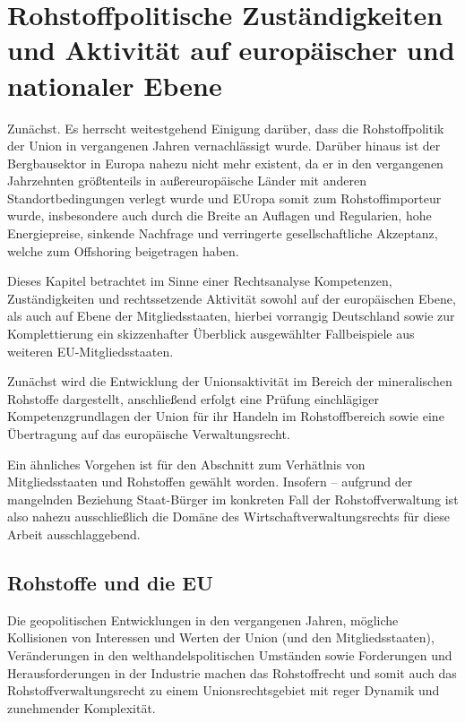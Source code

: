 \documentclass[12pt,a4paper,oneside]{book} %
\begin{document}
	
\chapter{Rohstoffpolitische Zuständigkeiten und Aktivität auf europäischer und nationaler Ebene}
Zunächst. Es herrscht weitestgehend Einigung darüber, dass die Rohstoffpolitik der Union in vergangenen Jahren vernachlässigt wurde.\autocite{Quantz, ZfPC 2024, 1} Darüber hinaus ist der Bergbausektor in Europa nahezu nicht mehr existent, da er in den vergangenen Jahrzehnten größtenteils in außereuropäische Länder mit anderen Standortbedingungen verlegt wurde und EUropa somit zum Rohstoffimporteur wurde, insbesondere auch durch die Breite an Auflagen und Regularien, hohe Energiepreise, sinkende Nachfrage und verringerte gesellschaftliche Akzeptanz, welche zum Offshoring beigetragen haben.\autocite{Frenz 2025, S. 72}

Dieses Kapitel betrachtet im Sinne einer Rechtsanalyse Kompetenzen, Zuständigkeiten und rechtssetzende Aktivität sowohl auf der europäischen Ebene, als auch auf Ebene der Mitgliedsstaaten, hierbei vorrangig Deutschland sowie zur Komplettierung ein skizzenhafter Überblick ausgewählter Fallbeispiele aus weiteren EU-Mitgliedsstaaten.	

Zunächst wird die Entwicklung der Unionsaktivität im Bereich der mineralischen Rohstoffe dargestellt, anschließend erfolgt eine Prüfung einchlägiger Kompetenzgrundlagen der Union für ihr Handeln im Rohstoffbereich sowie eine Übertragung auf das europäische Verwaltungsrecht.

Ein ähnliches Vorgehen ist für den Abschnitt zum Verhätlnis von Mitgliedsstaaten und Rohstoffen gewählt worden. Insofern -- aufgrund der mangelnden Beziehung Staat-Bürger im konkreten Fall der Rohstoffverwaltung ist also nahezu ausschließlich die Domäne des Wirtschaftverwaltungsrechts für diese Arbeit ausschlaggebend.


	
\section{Rohstoffe und die EU}

Die geopolitischen Entwicklungen in den vergangenen Jahren, mögliche Kollisionen von Interessen und Werten der Union (und den Mitgliedsstaaten), Veränderungen in den welthandelspolitischen Umständen sowie Forderungen und Herausforderungen in der Industrie machen das Rohstoffrecht und somit auch das Rohstoffverwaltungsrecht zu einem Unionsrechtsgebiet mit reger Dynamik und zunehmender Komplexität.
\end{document}
